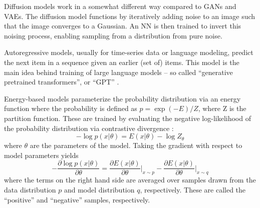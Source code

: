 Diffusion models \cite{ho_denoising_2020} work in a somewhat different way compared to GANs and VAEs. The diffusion model functions by iteratively adding noise to an image such that the image converges to a Gaussian. An NN is then trained to invert this noising process, enabling sampling from a distribution from pure noise. 

Autoregressive models, usually for time-series data or language modeling, predict the next item in a sequence given an earlier (set of) items. This model is the main idea behind training of large language models -- so called ``generative pretrained transformers'', or ``GPT'' \cite{radford_improving_2018}. 

Energy-based models parameterize the probability distribution via an energy function where the probability is defined as $p =\exp(-E) / Z$, where Z is the partition function. These are trained by evaluating the negative log-likelihood of the probability distribution via contrastive divergence \cite{hinton_training_2002, ruslan_deep_2009, tieleman_training_2008}: 
\begin{equation}
	- \log p(x\vert \theta) = E(x \vert \theta) - \log Z_\theta
\end{equation}
where $\theta$ are the parameters of the model. Taking the gradient with respect to model parameters yields 
\begin{equation}
	 - \frac{\partial \log p(x\vert \theta)}{\partial \theta} = \frac{\partial E(x \vert \theta)}{\partial \theta} \bigg \rvert_{x \sim p} - \frac{\partial E(x \vert \theta)}{\partial \theta} \bigg \rvert_{x \sim q}
\end{equation}
where the terms on the right hand side are averaged over samples drawn from the data distribution $p$ and model distribution $q$, respectively. These are called the ``positive'' and ``negative'' samples, respectively.






























